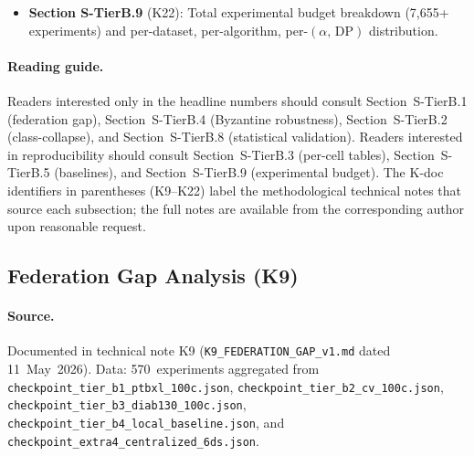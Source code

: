 \documentclass[conference]{IEEEtran}
\begin{document}
\begin{itemize}
\item \textbf{Section S-TierB.9} (K22): Total experimental budget breakdown (7{,}655+ experiments) and per-dataset, per-algorithm, per-$(\alpha,\,\text{DP})$ distribution.
\end{itemize}

\paragraph{Reading guide.} Readers interested only in the headline numbers should consult Section~S-TierB.1 (federation gap), Section~S-TierB.4 (Byzantine robustness), Section~S-TierB.2 (class-collapse), and Section~S-TierB.8 (statistical validation). Readers interested in reproducibility should consult Section~S-TierB.3 (per-cell tables), Section~S-TierB.5 (baselines), and Section~S-TierB.9 (experimental budget). The K-doc identifiers in parentheses (K9--K22) label the methodological technical notes that source each subsection; the full notes are available from the corresponding author upon reasonable request.

\subsection{Federation Gap Analysis (K9)}
\label{sec:tier_b_federation_gap}

\paragraph{Source.} Documented in technical note K9 (\texttt{K9\_FEDERATION\_GAP\_v1.md} dated 11~May~2026). Data: 570~experiments aggregated from \texttt{checkpoint\_tier\_b1\_ptbxl\_100c.json}, \texttt{checkpoint\_tier\_b2\_cv\_100c.json}, \texttt{checkpoint\_tier\_b3\_diab130\_100c.json}, \texttt{checkpoint\_tier\_b4\_local\_baseline.json}, and \texttt{checkpoint\_extra4\_centralized\_6ds.json}.
\end{document}
